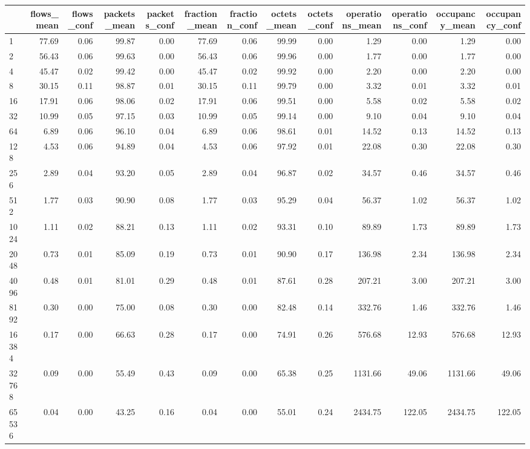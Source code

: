 \begin{tabular}{lrrrrrrrrrrrr}
\toprule
 & flows_mean & flows_conf & packets_mean & packets_conf & fraction_mean & fraction_conf & octets_mean & octets_conf & operations_mean & operations_conf & occupancy_mean & occupancy_conf \\
\midrule
1 & 77.69 & 0.06 & 99.87 & 0.00 & 77.69 & 0.06 & 99.99 & 0.00 & 1.29 & 0.00 & 1.29 & 0.00 \\
2 & 56.43 & 0.06 & 99.63 & 0.00 & 56.43 & 0.06 & 99.96 & 0.00 & 1.77 & 0.00 & 1.77 & 0.00 \\
4 & 45.47 & 0.02 & 99.42 & 0.00 & 45.47 & 0.02 & 99.92 & 0.00 & 2.20 & 0.00 & 2.20 & 0.00 \\
8 & 30.15 & 0.11 & 98.87 & 0.01 & 30.15 & 0.11 & 99.79 & 0.00 & 3.32 & 0.01 & 3.32 & 0.01 \\
16 & 17.91 & 0.06 & 98.06 & 0.02 & 17.91 & 0.06 & 99.51 & 0.00 & 5.58 & 0.02 & 5.58 & 0.02 \\
32 & 10.99 & 0.05 & 97.15 & 0.03 & 10.99 & 0.05 & 99.14 & 0.00 & 9.10 & 0.04 & 9.10 & 0.04 \\
64 & 6.89 & 0.06 & 96.10 & 0.04 & 6.89 & 0.06 & 98.61 & 0.01 & 14.52 & 0.13 & 14.52 & 0.13 \\
128 & 4.53 & 0.06 & 94.89 & 0.04 & 4.53 & 0.06 & 97.92 & 0.01 & 22.08 & 0.30 & 22.08 & 0.30 \\
256 & 2.89 & 0.04 & 93.20 & 0.05 & 2.89 & 0.04 & 96.87 & 0.02 & 34.57 & 0.46 & 34.57 & 0.46 \\
512 & 1.77 & 0.03 & 90.90 & 0.08 & 1.77 & 0.03 & 95.29 & 0.04 & 56.37 & 1.02 & 56.37 & 1.02 \\
1024 & 1.11 & 0.02 & 88.21 & 0.13 & 1.11 & 0.02 & 93.31 & 0.10 & 89.89 & 1.73 & 89.89 & 1.73 \\
2048 & 0.73 & 0.01 & 85.09 & 0.19 & 0.73 & 0.01 & 90.90 & 0.17 & 136.98 & 2.34 & 136.98 & 2.34 \\
4096 & 0.48 & 0.01 & 81.01 & 0.29 & 0.48 & 0.01 & 87.61 & 0.28 & 207.21 & 3.00 & 207.21 & 3.00 \\
8192 & 0.30 & 0.00 & 75.00 & 0.08 & 0.30 & 0.00 & 82.48 & 0.14 & 332.76 & 1.46 & 332.76 & 1.46 \\
16384 & 0.17 & 0.00 & 66.63 & 0.28 & 0.17 & 0.00 & 74.91 & 0.26 & 576.68 & 12.93 & 576.68 & 12.93 \\
32768 & 0.09 & 0.00 & 55.49 & 0.43 & 0.09 & 0.00 & 65.38 & 0.25 & 1131.66 & 49.06 & 1131.66 & 49.06 \\
65536 & 0.04 & 0.00 & 43.25 & 0.16 & 0.04 & 0.00 & 55.01 & 0.24 & 2434.75 & 122.05 & 2434.75 & 122.05 \\

\end{tabular}
